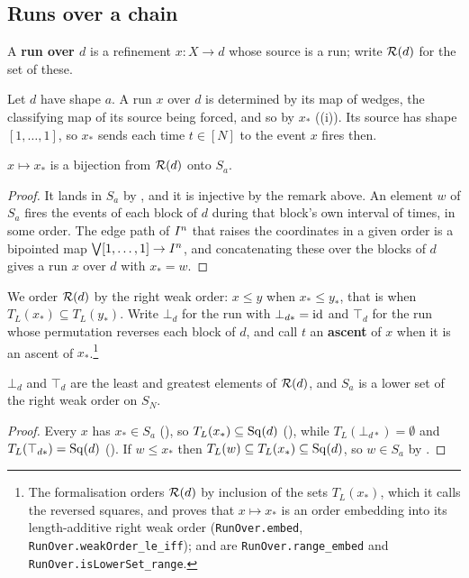 \documentclass[11pt]{article}
\begin{document}
\subsection{Runs over a chain}

\begin{definition}\label{def:runover}
  A \textbf{run over $d$} is a refinement $x : X \to d$ whose source is a run; write $\mathcal{R}(d)$
  for the set of these.
\end{definition}

Let $d$ have shape $a$. A run $x$ over $d$ is determined by its map of wedges, the classifying map
of its source being forced, and so by $x_*$ ((i)). Its source has shape
$[1,\dots,1]$, so $x_*$ sends each time $t \in [N]$ to the event $x$ fires then.

\begin{lemma}\label{lem:firing-blocks}
  $x \mapsto x_*$ is a bijection from $\mathcal{R}(d)$ onto $S_a$.
\end{lemma}
\begin{proof}
  It lands in $S_a$ by , and it is injective by the remark above. An element $w$ of
  $S_a$ fires the events of each block of $d$ during that block's own interval of times, in some
  order. The edge path of $I^{n}$ that raises the coordinates in a given order is a bipointed map
  $\bigvee[1,\dots,1] \to I^{n}$, and concatenating these over the blocks of $d$ gives a run $x$
  over $d$ with $x_* = w$.
\end{proof}

We order $\mathcal{R}(d)$ by the right weak order: $x \le y$ when $x_* \le y_*$, that is when
$T_L(x_*) \subseteq T_L(y_*)$. Write
$\bot_d$ for the run with $\bot_{d*} = \operatorname{id}$ and $\top_d$ for the run whose permutation reverses
each block of $d$, and call $t$ an \textbf{ascent} of $x$ when it is an ascent of
$x_*$.\footnote{The formalisation \cite{Cubical} orders $\mathcal{R}(d)$ by inclusion of the sets $T_L(x_*)$, which it calls the reversed squares, and
proves that $x \mapsto x_*$ is an order embedding into its length-additive right weak order
(\texttt{RunOver.embed}, \texttt{RunOver.weakOrder\_le\_iff});  and
 are \texttt{RunOver.range\_embed} and \texttt{RunOver.isLowerSet\_range}.}

\begin{lemma}\label{lem:lower}
  $\bot_d$ and $\top_d$ are the least and greatest elements of $\mathcal{R}(d)$, and $S_a$ is a lower
  set of the right weak order on $S_N$.
\end{lemma}
\begin{proof}
  Every $x$ has $x_* \in S_a$ (), so $T_L(x_*) \subseteq \operatorname{Sq}(d)$
  (), while
  $T_L(\bot_{d*}) = \emptyset$ and $T_L(\top_{d*}) = \operatorname{Sq}(d)$ (). If
  $w \le x_*$ then $T_L(w) \subseteq T_L(x_*) \subseteq \operatorname{Sq}(d)$, so $w \in S_a$ by
  .
\end{proof}
\end{document}
